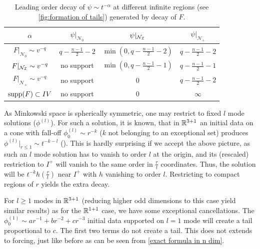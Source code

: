 \documentclass[11pt, oneside]{amsart}
\begin{document}
	
	\begin{table}
		\begin{center}
			\begin{tabular}{|c|c|c|c|}\hline
				$\alpha$ & $\psi|_{\mathcal{N}_0}$ & $\psi|_{\mathcal{N}_{\mathcal{I}}}$ & $\psi|_{\mathcal{N}_+}$  \\ \hline
				$F|_{\mathcal{N}_0}\sim v^{-q}$ & $q-\frac{n-1}{2}-2$  & $\min(0,q-\frac{n-1}{2}-2)$& $q-\frac{n-1}{2}-2$ \\ \hline
				$F|_{\mathcal{N}_{\mathcal{I}}}\sim v^{-q}$ &  no support & $\min(0,q-\frac{n-1}{2}-1)$ & $q-\frac{n-1}{2}-1$ \\ \hline
				$F|_{\mathcal{N}_+}\sim v^{-q}$ & no support & $0$ & $q-\frac{n-1}{2}-2$ \\ \hline
				$\operatorname{supp}(F)\subset IV$ & no support & $0$ & $\infty$ \\ \hline
			\end{tabular}
		\end{center}
		\caption{Leading order decay of $\psi\sim t^{-\alpha}$ at different infinite regions (see \cref{fig:formation of tails}) generated by decay of $F$. }
		\label{table:decays}
	\end{table}


	\begin{remark}
		As Minkowski space is spherically symmetric, one may restrict to fixed $l$ mode solutions ($\phi^{(l)}$). For such a solution, it is known, that in $\mathbb{R}^{3+1}$ an initial data on a cone with fall-off $\phi^{(l)}_0\sim r^{-k}$ ($k$ not belonging to an exceptional set) produces $\phi^{(l)}|_{r\leq1}\sim t^{-k-l}$ (\cite{luk_tale_2021}). This is hardly surprising if we accept the above picture, as such an $l$ mode solution has to vanish to order $l$ at the origin, and its (rescaled) restriction to $I^+$ will vanish to the same order in $\frac{r}{t}$ coordinates. Thus, the solution will be $t^{-k}h(\frac{r}{t})$ near $I^+$ with $h$ vanishing to order $l$. Restricting to compact regions of $r$ yields the extra decay.
	\end{remark}
	\begin{remark}\label{exceptional cancellation}
		For $l\geq1$ modes in $\mathbb{R}^{3+1}$ (reducing higher odd dimensions to this case yield similar results) as for the $\mathbb{R}^{1+1}$ case, we have some exceptional cancellations. The $\phi^{(1)}_0\sim ar^{-1}+br^{-2}+cr^{-3}$ initial data supported on $l=1$ mode will create a tail proportional to $c$. The first two terms do not create a tail. This does not extends to forcing, just like before as can be seen from  \eqref{exact formula in n dim}. 
	\end{remark}
	
\end{document}
